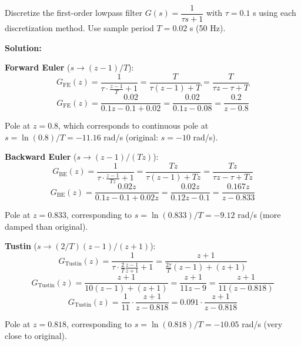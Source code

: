 \begin{example}
\label{ex:first_order_discretization}
Discretize the first-order lowpass filter $G(s) = \dfrac{1}{\tau s + 1}$ with $\tau = 0.1$ s using each discretization method. Use sample period $T = 0.02$ s (50 Hz).

\textbf{Solution:}

\textbf{Forward Euler} ($s \rightarrow (z-1)/T$):
\begin{equation*}
G_{\text{FE}}(z) = \frac{1}{\tau \cdot \frac{z-1}{T} + 1} = \frac{T}{\tau(z-1) + T} = \frac{T}{\tau z - \tau + T}
\end{equation*}
\begin{equation*}
G_{\text{FE}}(z) = \frac{0.02}{0.1z - 0.1 + 0.02} = \frac{0.02}{0.1z - 0.08} = \frac{0.2}{z - 0.8}
\end{equation*}

Pole at $z = 0.8$, which corresponds to continuous pole at $s = \ln(0.8)/T = -11.16$ rad/s (original: $s = -10$ rad/s).

\textbf{Backward Euler} ($s \rightarrow (z-1)/(Tz)$):
\begin{equation*}
G_{\text{BE}}(z) = \frac{1}{\tau \cdot \frac{z-1}{Tz} + 1} = \frac{Tz}{\tau(z-1) + Tz} = \frac{Tz}{\tau z - \tau + Tz}
\end{equation*}
\begin{equation*}
G_{\text{BE}}(z) = \frac{0.02z}{0.1z - 0.1 + 0.02z} = \frac{0.02z}{0.12z - 0.1} = \frac{0.167z}{z - 0.833}
\end{equation*}

Pole at $z = 0.833$, corresponding to $s = \ln(0.833)/T = -9.12$ rad/s (more damped than original).

\textbf{Tustin} ($s \rightarrow (2/T)(z-1)/(z+1)$):
\begin{equation*}
G_{\text{Tustin}}(z) = \frac{1}{\tau \cdot \frac{2}{T}\frac{z-1}{z+1} + 1} = \frac{z+1}{\frac{2\tau}{T}(z-1) + (z+1)}
\end{equation*}
\begin{equation*}
G_{\text{Tustin}}(z) = \frac{z+1}{10(z-1) + (z+1)} = \frac{z+1}{11z - 9} = \frac{z+1}{11(z - 0.818)}
\end{equation*}
\begin{equation*}
G_{\text{Tustin}}(z) = \frac{1}{11} \cdot \frac{z+1}{z - 0.818} = 0.091 \cdot \frac{z+1}{z - 0.818}
\end{equation*}

Pole at $z = 0.818$, corresponding to $s = \ln(0.818)/T = -10.05$ rad/s (very close to original).


\end{example}
